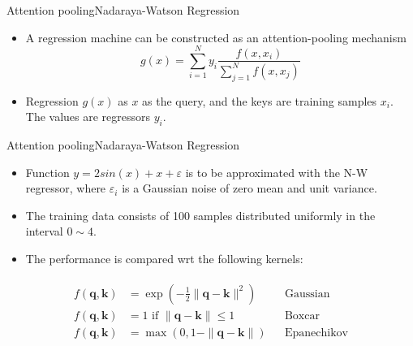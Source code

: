 \documentclass{beamer}
\begin{document}
\begin{frame}{Attention pooling}{Nadaraya-Watson Regression}
\begin{itemize}
    \item A regression machine can be constructed as an attention-pooling mechanism 
    \begin{equation}
        g(x) = \sum_{i=1}^N y_i \frac{f(x,x_i)}{\sum_{j=1}^N f(x,x_j)} 
    \end{equation}
\item Regression $g(x)$   as $x$ as the query, and the keys are training samples $x_i$. The values are regressors $y_i$. 
\end{itemize}
\end{frame}
\begin{frame}{Attention pooling}{Nadaraya-Watson Regression}
\begin{itemize}
    \item Function $y = 2 sin(x) + x + \varepsilon$ is to be approximated with the N-W regressor, where $\varepsilon_i$ is a Gaussian noise of zero mean and unit variance. 
    \item The training data consists of 100 samples distributed uniformly in the interval $0 \sim 4$.
    \item The performance is compared wrt the following kernels: 
\end{itemize}
\begin{equation}
\begin{split}\begin{aligned}
f(\mathbf{q}, \mathbf{k}) & = \exp\left(-\frac{1}{2} \|\mathbf{q} - \mathbf{k}\|^2 \right) && \mathrm{Gaussian} \\
f(\mathbf{q}, \mathbf{k}) & = 1 \text{ if } \|\mathbf{q} - \mathbf{k}\| \leq 1 && \mathrm{Boxcar} \\
f(\mathbf{q}, \mathbf{k}) & = \mathop{\mathrm{max}}\left(0, 1 - \|\mathbf{q} - \mathbf{k}\|\right) && \mathrm{Epanechikov}
\end{aligned}\end{split}
\end{equation}
   
\end{frame}
\end{document}
